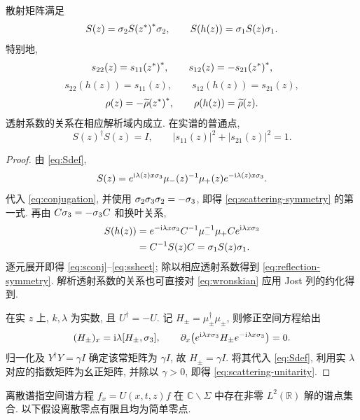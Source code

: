 \begin{proposition}\label{prop:scattering-symmetry}
散射矩阵满足
\begin{equation}\label{eq:scattering-symmetry}
S(z)=\sigma_2{S({z}^{*})}^{*}\sigma_2,\qquad
S(h(z))=\sigma_1S(z)\sigma_1.
\end{equation}
特别地,
\begin{equation}\label{eq:sconj}
s_{22}(z)={s_{11}({z}^{*})}^{*},\qquad
s_{12}(z)=-{s_{21}({z}^{*})}^{*},
\end{equation}
\begin{equation}\label{eq:ssheet}
s_{22}(h(z))=s_{11}(z),\qquad s_{12}(h(z))=s_{21}(z),
\end{equation}
\begin{equation}\label{eq:reflection-symmetry}
\rho(z)=-{\widetilde\rho({z}^{*})}^{*},\qquad
\rho(h(z))=\widetilde\rho(z).
\end{equation}
透射系数的关系在相应解析域内成立. 在实谱的普通点,
\begin{equation}\label{eq:scattering-unitarity}
S(z)^\dagger S(z)=I,\qquad
|s_{11}(z)|^2+|s_{21}(z)|^2=1.
\end{equation}
\end{proposition}
\begin{proof}
由 \eqref{eq:Sdef},
\begin{equation*}
S(z)=e^{\mathrm{i}\lambda(z)x\sigma_3}\mu_-(z)^{-1}\mu_+(z)e^{-\mathrm{i}\lambda(z)x\sigma_3}.
\end{equation*}
代入 \eqref{eq:conjugation}, 并使用 $\sigma_2\sigma_3\sigma_2=-\sigma_3$,
即得 \eqref{eq:scattering-symmetry} 的第一式. 再由 $C\sigma_3=-\sigma_3 C$ 和换叶关系,
\begin{equation*}
\begin{aligned}
S(h(z))
&=e^{-\mathrm{i}\lambda x\sigma_3}C^{-1}\mu_-^{-1}\mu_+Ce^{\mathrm{i}\lambda x\sigma_3}\\
&=C^{-1}S(z)C=\sigma_1S(z)\sigma_1.
\end{aligned}
\end{equation*}
逐元展开即得 \eqref{eq:sconj}--\eqref{eq:ssheet}; 除以相应透射系数得到 \eqref{eq:reflection-symmetry}. 解析透射系数的关系也可直接对 \eqref{eq:wronskian} 应用 Jost 列的约化得到.

在实 $z$ 上, $k,\lambda$ 为实数, 且 $U^\dagger=-U$.
记 $H_\pm=\mu_\pm^\dagger\mu_\pm$, 则修正空间方程给出
\begin{equation*}
(H_\pm)_x=\mathrm{i}\lambda[H_\pm,\sigma_3],\qquad
\partial_x\!\left(e^{\mathrm{i}\lambda x\sigma_3}H_\pm e^{-\mathrm{i}\lambda x\sigma_3}\right)=0.
\end{equation*}
归一化及 $Y^\dagger Y=\gamma I$ 确定该常矩阵为 $\gamma I$, 故 $H_\pm=\gamma I$.
将其代入 \eqref{eq:Sdef}, 利用实 $\lambda$ 对应的指数矩阵为幺正矩阵,
并除以 $\gamma>0$, 即得 \eqref{eq:scattering-unitarity}.
\end{proof}
离散谱指空间谱方程 $f_x=U(x,t,z)f$ 在 $\mathbb C\mathbin{\backslash}\Sigma$ 中存在非零 $L^2(\mathbb R)$ 解的谱点集合.
以下假设离散零点有限且均为简单零点.

